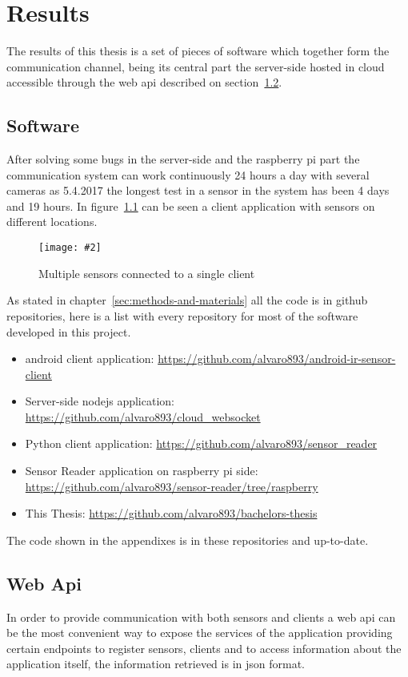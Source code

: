 \documentclass[hidelinks,11pt,a4paper,oneside,article]{memoir}
\newcommand{\putimage}[3][10] %
{
\begin{figure}[h]
	\centering
	\captionsetup{justification=centering}
	\texttt{[image: \#2]}
	\caption{#3}
	\label{fig:#2}
\end{figure}
}
\begin{document}
\clearpage\chapter{Results}\label{sec:results}
The results of this thesis is a set of pieces of software which together form the communication channel, being its central part the server-side hosted in cloud accessible through the web \gls{api} described on section~\ref{sec:web-api}.



\section{Software}\label{sec:software}
After solving some bugs in the server-side and the raspberry pi part the communication system can work continuously 24 hours a day with several cameras as 5.4.2017 the longest test in a sensor in the system has been 4 days and 19 hours. In figure~\ref{fig:multi-camera} can be seen a client application with sensors on different locations.

     \putimage{multi-camera}{Multiple sensors connected to a single client}

As stated in chapter~\ref{sec:methods-and-materials} all the code is in \gls{github} repositories, here is a list with every repository for most of the software developed in this project.


\begin{itemize}
    \item \gls{android} client application: \url{https://github.com/alvaro893/android-ir-sensor-client}
    \item Server-side \gls{nodejs} application: \url{https://github.com/alvaro893/cloud_websocket}
    \item Python client application: \url{https://github.com/alvaro893/sensor_reader}
    \item Sensor Reader application on raspberry pi side: \url{https://github.com/alvaro893/sensor-reader/tree/raspberry}
    \item This Thesis: \url{https://github.com/alvaro893/bachelors-thesis}
\end{itemize}

The code shown in the appendixes is in these repositories and up-to-date.


\section{Web Api}\label{sec:web-api}
In order to provide communication with both sensors and clients a web \gls{api} can be the most convenient way to expose the services of the application providing certain endpoints to register sensors, clients and to access information about the application itself, the information retrieved is in \gls{json} format.
\end{document}
